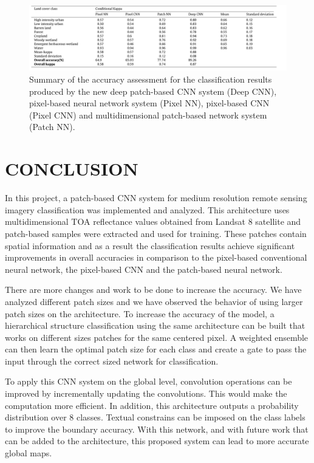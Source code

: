 \documentclass[letterpaper, 10 pt, conference]{ieeeconf}  %
\begin{document}
\begin{figure}[!t]
	\centering
	\includegraphics[scale=0.8]{comparisons.png}
	\caption{Summary of the accuracy assessment for the classification results produced by the new deep patch-based CNN system (Deep CNN), pixel-based neural network system (Pixel NN), pixel-based CNN (Pixel CNN) and multidimensional patch-based network system (Patch NN).}
	\label{figurelabel}
\end{figure}




\section{CONCLUSION}

In this project, a patch-based CNN system for medium resolution remote sensing imagery classification was implemented and analyzed. This architecture uses multidimensional TOA reflectance values obtained from Landsat 8 satellite and patch-based samples were extracted and used for training. These patches contain spatial information and as a result the classification results achieve significant improvements in overall accuracies in comparison to the pixel-based conventional neural network, the pixel-based CNN and the patch-based neural network.

There are more changes and work to be done to increase the accuracy. We have analyzed different patch sizes and we have observed the behavior of using larger patch sizes on the architecture. To increase the accuracy of the model, a hierarchical structure classification using the same architecture can be built that works on different sizes patches for the same centered pixel. A weighted ensemble can then learn the optimal patch size for each class and create a gate to pass the input through the correct sized network for classification.

To apply this CNN system on the global level, convolution operations can be improved by incrementally updating the convolutions. This would make the computation more efficient. In addition, this architecture outputs a probability distribution over 8 classes. Textual constrains can be imposed on the class labels to improve the boundary accuracy. With this network, and with future work that can be added to the architecture, this proposed system can lead to more accurate global maps.
\end{document}
